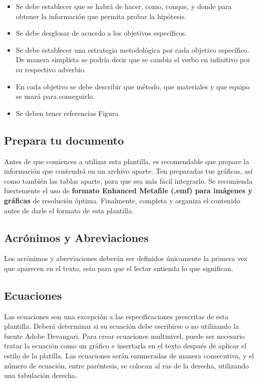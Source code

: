     \begin{itemize}
        \item Se debe establecer que se habrá de hacer, como, conque, y donde para obtener la información que permita probar la hipótesis.  
        \item Se debe desglosar de acuerdo a los objetivos específicos. 
        \item Se debe establecer una estrategia metodológica por cada objetivo específico. De manera simplista se podría decir que se cambia el verbo en infinitivo por su respectivo adverbio.
        \item En cada objetivo se debe describir que método, que materiales y que equipo se usará para conseguirlo.
        \item Se deben tener referencias Figura 
    \end{itemize}
    
    \subsection{Prepara tu documento}
    
    Antes de que comiences a utilizar esta plantilla, es recomendable que prepare la información que contendrá en un archivo aparte. 
    Ten preparadas tus gráficas, así como también las tablas aparte, para que sea más fácil integrarlo. 
    Se recomienda fuertemente el uso de \textbf{formato Enhanced Metafile (.emf) para imágenes y gráficas} de resolución óptima. 
    Finalmente, completa y organiza el contenido antes de darle el formato de esta plantilla. 
    
    \subsection{Acrónimos y Abreviaciones}
    
    Los acrónimos y abreviaciones deberán ser definidos únicamente la primera vez que aparecen en el texto, esto para que el lector entienda lo que significan.
    
    \subsection{Ecuaciones}
    
    Las ecuaciones son una excepción a las especificaciones prescritas de esta plantilla. 
    Deberá determinar si su ecuación debe escribirse o no utilizando la fuente Adobe Devangari. 
    Para crear ecuaciones multinivel, puede ser necesario tratar la ecuación como un gráfico e insertarla en el texto después de aplicar el estilo de la platilla.
    Las ecuaciones serán enumeradas de manera consecutiva, y el número de ecuación, entre paréntesis, se colocan al ras de la derecha, utilizando una tabulación derecha. 
    
